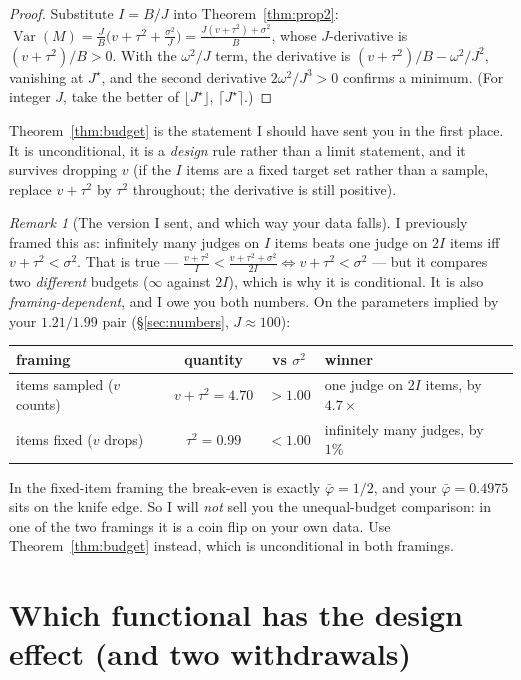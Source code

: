 \documentclass[11pt]{article}
\theoremstyle{plain}
\theoremstyle{definition}
\theoremstyle{remark}
\newtheorem{remark}[theorem]{Remark}
\newcommand{\Var}{\operatorname{Var}}
\newcommand{\pb}{\bar{\varphi}}
\begin{document}
\begin{proof}
Substitute $I=B/J$ into Theorem~\ref{thm:prop2}:
$\Var(M)=\frac{J}{B}\big(v+\tau^2+\frac{\sigma^2}{J}\big)=\frac{J(v+\tau^2)+\sigma^2}{B}$, whose
$J$-derivative is $(v+\tau^2)/B>0$. With the $\omega^2/J$ term, the derivative is
$(v+\tau^2)/B-\omega^2/J^2$, vanishing at $J^\star$, and the second derivative $2\omega^2/J^3>0$
confirms a minimum. (For integer $J$, take the better of $\lfloor J^\star\rfloor$,
$\lceil J^\star\rceil$.)
\end{proof}

Theorem~\ref{thm:budget} is the statement I should have sent you in the first place. It is
unconditional, it is a \emph{design} rule rather than a limit statement, and it survives
dropping $v$ (if the $I$ items are a fixed target set rather than a sample, replace $v+\tau^2$
by $\tau^2$ throughout; the derivative is still positive).

\begin{remark}[The version I sent, and which way your data falls]\label{rem:prop3}
I previously framed this as: infinitely many judges on $I$ items beats one judge on $2I$ items
iff $v+\tau^2<\sigma^2$. That is true --- $\frac{v+\tau^2}{I}<\frac{v+\tau^2+\sigma^2}{2I}
\iff v+\tau^2<\sigma^2$ --- but it compares two \emph{different} budgets ($\infty$ against $2I$),
which is why it is conditional. It is also \emph{framing-dependent}, and I owe you both numbers.
On the parameters implied by your $1.21/1.99$ pair (\S\ref{sec:numbers}, $J\approx100$):
\begin{center}
\begin{tabular}{@{}lccl@{}}
\toprule
framing & quantity & vs $\sigma^2$ & winner \\
\midrule
items sampled ($v$ counts) & $v+\tau^2=4.70$ & $>1.00$ & one judge on $2I$ items, by $4.7\times$\\
items fixed ($v$ drops)    & $\tau^2=0.99$    & $<1.00$ & infinitely many judges, by $1\%$\\
\bottomrule
\end{tabular}
\end{center}
In the fixed-item framing the break-even is exactly $\pb=1/2$, and your $\pb=0.4975$ sits on the
knife edge. So I will \emph{not} sell you the unequal-budget comparison: in one of the two
framings it is a coin flip on your own data. Use Theorem~\ref{thm:budget} instead, which is
unconditional in both framings.
\end{remark}

\section{Which functional has the design effect (and two withdrawals)}
\label{sec:corrections}
\end{document}
